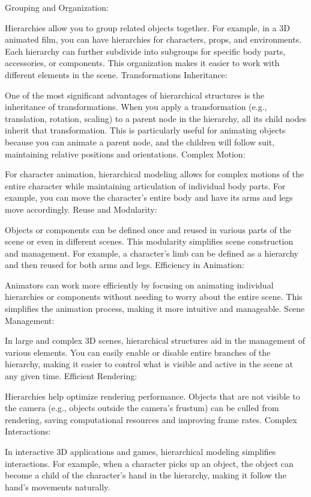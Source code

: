 \documentclass{article}
\begin{document}
\begin{itemize}
Grouping and Organization:

Hierarchies allow you to group related objects together. For example, in a 3D animated film, you can have hierarchies for characters, props, and environments. Each hierarchy can further subdivide into subgroups for specific body parts, accessories, or components. This organization makes it easier to work with different elements in the scene.
Transformations Inheritance:

One of the most significant advantages of hierarchical structures is the inheritance of transformations. When you apply a transformation (e.g., translation, rotation, scaling) to a parent node in the hierarchy, all its child nodes inherit that transformation. This is particularly useful for animating objects because you can animate a parent node, and the children will follow suit, maintaining relative positions and orientations.
Complex Motion:

For character animation, hierarchical modeling allows for complex motions of the entire character while maintaining articulation of individual body parts. For example, you can move the character's entire body and have its arms and legs move accordingly.
Reuse and Modularity:

Objects or components can be defined once and reused in various parts of the scene or even in different scenes. This modularity simplifies scene construction and management. For example, a character's limb can be defined as a hierarchy and then reused for both arms and legs.
Efficiency in Animation:

Animators can work more efficiently by focusing on animating individual hierarchies or components without needing to worry about the entire scene. This simplifies the animation process, making it more intuitive and manageable.
Scene Management:

In large and complex 3D scenes, hierarchical structures aid in the management of various elements. You can easily enable or disable entire branches of the hierarchy, making it easier to control what is visible and active in the scene at any given time.
Efficient Rendering:

Hierarchies help optimize rendering performance. Objects that are not visible to the camera (e.g., objects outside the camera's frustum) can be culled from rendering, saving computational resources and improving frame rates.
Complex Interactions:

In interactive 3D applications and games, hierarchical modeling simplifies interactions. For example, when a character picks up an object, the object can become a child of the character's hand in the hierarchy, making it follow the hand's movements naturally.

\end{itemize}
\end{document}
